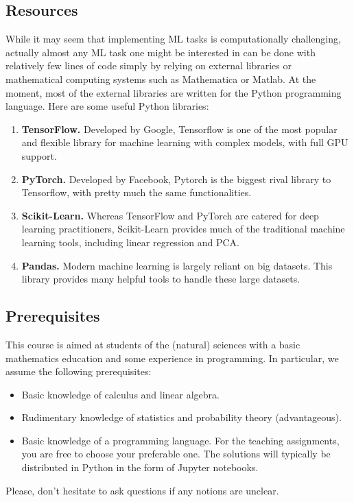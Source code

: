 \subsection{Resources}
While it may seem that implementing ML tasks is computationally challenging, actually almost any ML task one might be interested in can be done with relatively few lines of code simply by relying on external libraries or mathematical computing systems such as Mathematica or Matlab. At the moment, most of the external libraries are written for the Python programming language.
Here are some useful Python libraries:
\begin{enumerate}
    \item \textbf{TensorFlow.} Developed by Google, Tensorflow is one of the most popular and flexible library for machine learning with complex models, with full GPU support.
    \item \textbf{PyTorch.} Developed by Facebook, Pytorch is the biggest rival library to Tensorflow, with pretty much the same functionalities.
    \item \textbf{Scikit-Learn.} Whereas TensorFlow and PyTorch are catered for deep learning practitioners, Scikit-Learn provides much of the traditional machine learning tools, including linear regression and PCA.
    \item \textbf{Pandas.} Modern machine learning is largely reliant on big datasets. This library provides many helpful tools to handle these large datasets.
\end{enumerate}

\subsection{Prerequisites}
This course is aimed at students of the (natural) sciences with a basic mathematics education and some experience in programming. In particular, we assume the following prerequisites:
\begin{itemize}
  \item Basic knowledge of calculus and linear algebra.
  \item Rudimentary knowledge of statistics and probability theory (advantageous).
  \item Basic knowledge of a programming language. For the teaching assignments, you are free to choose your preferable one. The solutions will typically be distributed in Python in the form of Jupyter notebooks.
\end{itemize}
Please, don't hesitate to ask questions if any notions are unclear.

